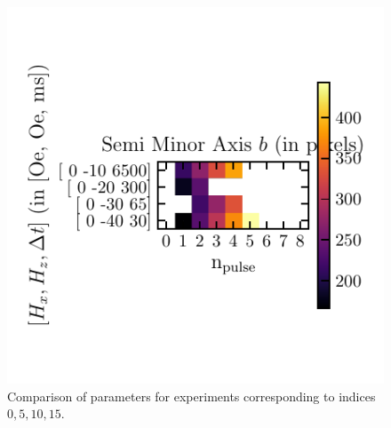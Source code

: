 \documentclass[12pt, twoside, a4paper]{article}
\begin{document}
\begin{figure}[!htbp]
	\includegraphics[scale=1.0]{figures/11_FitsSubSpace/0_5_10_15__Semi-Minor-Axis.pdf}
	\caption{Comparison of parameters for experiments corresponding to indices $0, 5, 10, 15$.
	}
	\label{openCV fit parameters some experiments}
\end{figure}
%
\end{document}
